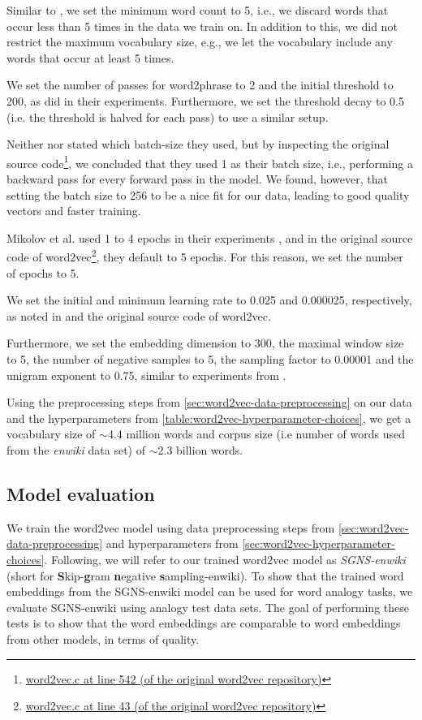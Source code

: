 Similar to \cite{mikolov2013b}, we set the minimum word count to 5, i.e., we discard words that occur less than 5 times in the data we train on. In addition to this, we did not restrict the maximum vocabulary size, e.g., we let the vocabulary include any words that occur at least 5 times.

We set the number of passes for word2phrase to 2 and the initial threshold to 200, as \cite{mikolov2013b} did in their experiments. Furthermore, we set the threshold decay to 0.5 (i.e. the threshold is halved for each pass) to use a similar setup.

Neither \cite{mikolov2013a} nor \cite{mikolov2013b} stated which batch-size they used, but by inspecting the original source code\footnote{\href{https://github.com/tmikolov/word2vec/blob/e092540633572b883e25b367938b0cca2cf3c0e7/word2vec.c/\#L542}{word2vec.c at line 542 (of the original word2vec repository)}}, we concluded that they used 1 as their batch size, i.e., performing a backward pass for every forward pass in the model. We found, however, that setting the batch size to 256 to be a nice fit for our data, leading to good quality vectors and faster training.

Mikolov et al. used 1 to 4 epochs in their experiments \cite{mikolov2013a, mikolov2013b}, and in the original source code of word2vec\footnote{\href{https://github.com/tmikolov/word2vec/blob/e092540633572b883e25b367938b0cca2cf3c0e7/word2vec.c/\#L43}{word2vec.c at line 43 (of the original word2vec repository)}}, they default to 5 epochs. For this reason, we set the number of epochs to 5.

We set the initial and minimum learning rate to 0.025 and 0.000025, respectively, as noted in \cite{mikolov2013a} and the original source code of word2vec.

Furthermore, we set the embedding dimension to 300, the maximal window size to 5, the number of negative samples to 5, the sampling factor to 0.00001 and the unigram exponent to 0.75, similar to experiments from \cite{mikolov2013b}.

Using the preprocessing steps from \cref{sec:word2vec-data-preprocessing} on our data and the hyperparameters from \cref{table:word2vec-hyperparameter-choices}, we get a vocabulary size of $\sim$4.4 million words and corpus size (i.e number of words used from the \textit{enwiki} data set) of $\sim$2.3 billion words.

\subsection{Model evaluation}
We train the word2vec model using data preprocessing steps from \cref{sec:word2vec-data-preprocessing} and hyperparameters from \cref{sec:word2vec-hyperparameter-choices}. Following, we will refer to our trained word2vec model as \textit{SGNS-enwiki} (short for \textbf{S}kip-\textbf{g}ram \textbf{n}egative \textbf{s}ampling-enwiki). To show that the trained word embeddings from the SGNS-enwiki model can be used for word analogy tasks, we evaluate SGNS-enwiki using analogy test data sets. The goal of performing these tests is to show that the word embeddings are comparable to word embeddings from other models, in terms of quality.

